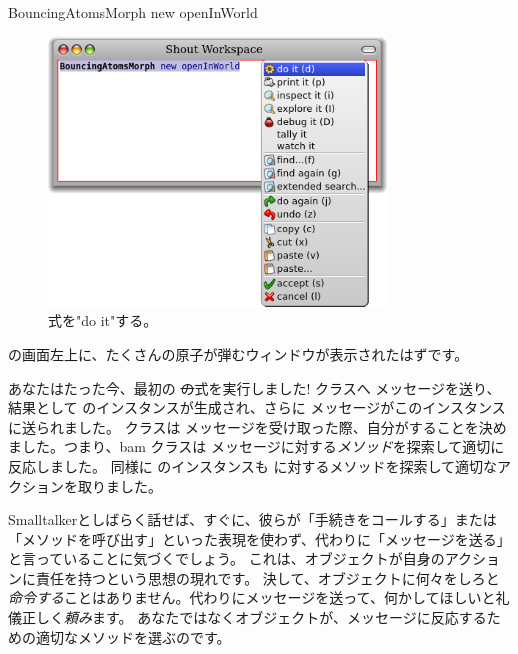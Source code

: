 \documentclass[a4paper,10pt,twoside]{book}
\begin{document}

\begin{code}{}
BouncingAtomsMorph new openInWorld
\end{code}


\begin{figure}[htb]
\centerline {\includegraphics[width=0.8\textwidth]{Doit}}
\caption{式を"do it"する。}
\end{figure}

\pharo の画面左上に、たくさんの原子が弾むウィンドウが表示されたはずです。

あなたはたった今、最初の \st の式を実行しました!
\bam クラスへ  メッセージを送り、結果として \bam のインスタンスが生成され、さらに  メッセージがこのインスタンスに送られました。
\bam クラスは  メッセージを受け取った際、自分がすることを決めました。つまり、bam クラスは  メッセージに対する\emph{メソッド}を探索して適切に反応しました。
同様に \bam のインスタンスも  に対するメソッドを探索して適切なアクションを取りました。

Smalltalkerとしばらく話せば、すぐに、彼らが「手続きをコールする」または「メソッドを呼び出す」といった表現を使わず、代わりに「メッセージを送る」と言っていることに気づくでしょう。
これは、オブジェクトが自身のアクションに責任を持つという思想の現れです。
決して、オブジェクトに何々をしろと\emph{命令する}ことはありません。代わりにメッセージを送って、何かしてほしいと礼儀正しく\emph{頼み}ます。
あなたではなくオブジェクトが、メッセージに反応するための適切なメソッドを選ぶのです。
\end{document}
